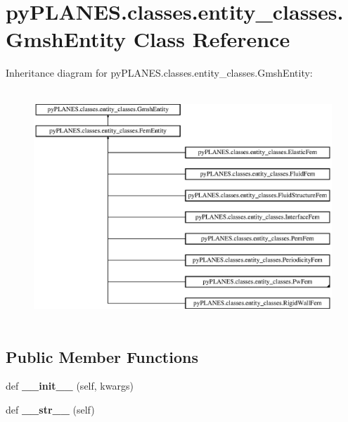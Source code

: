 \hypertarget{classpy_p_l_a_n_e_s_1_1classes_1_1entity__classes_1_1_gmsh_entity}{}\section{py\+P\+L\+A\+N\+E\+S.\+classes.\+entity\+\_\+classes.\+Gmsh\+Entity Class Reference}
\label{classpy_p_l_a_n_e_s_1_1classes_1_1entity__classes_1_1_gmsh_entity}
Inheritance diagram for py\+P\+L\+A\+N\+E\+S.\+classes.\+entity\+\_\+classes.\+Gmsh\+Entity\+:\begin{figure}[H]
\begin{center}
\leavevmode
\includegraphics[height=8.750000cm]{classpy_p_l_a_n_e_s_1_1classes_1_1entity__classes_1_1_gmsh_entity}
\end{center}
\end{figure}
\subsection*{Public Member Functions}
\begin{DoxyCompactItemize}
\item 
\mbox{\label{classpy_p_l_a_n_e_s_1_1classes_1_1entity__classes_1_1_gmsh_entity_ac0b16634fcb368904b7d9a7cb1475238}} 
def {\bfseries \+\_\+\+\_\+init\+\_\+\+\_\+} (self, kwargs)
\item 
\mbox{\label{classpy_p_l_a_n_e_s_1_1classes_1_1entity__classes_1_1_gmsh_entity_acdad5ba14e121280df533bdb3da862d5}} 
def {\bfseries \+\_\+\+\_\+str\+\_\+\+\_\+} (self)
\end{DoxyCompactItemize}
